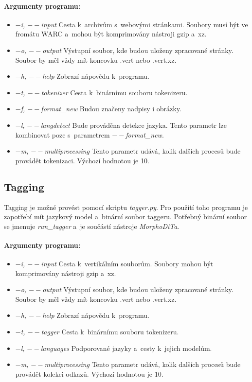 \paragraph{Argumenty programu: }
\begin{itemize}
    \item \textit{$-$i, $--$input} Cesta k~archivům s~webovými stránkami. Soubory musí být ve fromátu WARC a~mohou být komprimovány nástroji gzip a~xz.
    \item \textit{$-$o, $--$output} Výstupní soubor, kde budou uloženy zpracované stránky. Soubor by měl vždy mít koncovku .vert nebo .vert.xz.
    \item \textit{$-$h, $--$help} Zobrazí nápovědu k~programu.
    \item \textit{$-$t, $--$tokenizer} Cesta k~binárnímu souboru tokenizeru.
    \item \textit{$-$f, $--$format\_new} Budou značeny nadpisy i obrázky.
    \item \textit{$-$l, $--$langdetect} Bude prováděna detekce jazyka. Tento parametr lze kombinovat poze s~parametrem \textit{$--$format\_new}.
    \item \textit{$-$m, $--$multiprocessing} Tento parametr udává, kolik dalších procesů bude provádět tokenizaci. Výchozí hodnotou je 10.
\end{itemize}

\subsection{Tagging}
Tagging je možné provést pomocí skriptu \textit{tagger.py}. Pro použití toho programu je zapotřebí
mít jazykový model a~binární soubor taggeru. Potřebný binární soubor se jmenuje \textit{run\_tagger}
a~je součástí nástroje \textit{MorphoDiTa}.

\paragraph{Argumenty programu: }
\begin{itemize}
    \item \textit{$-$i, $--$input} Cesta k~vertikálním souborům. Soubory mohou být komprimovány nástroji gzip a~xz.
    \item \textit{$-$o, $--$output} Výstupní soubor, kde budou uloženy zpracované stránky. Soubor by měl vždy mít koncovku .vert nebo .vert.xz.
    \item \textit{$-$h, $--$help} Zobrazí nápovědu k~programu.
    \item \textit{$-$t, $--$tagger} Cesta k~binárnímu souboru tokenizeru.
    \item \textit{$-$l, $--$languages} Podporované jazyky a~cesty k~jejich modelům.
    \item \textit{$-$m, $--$multiprocessing} Tento parametr udává, kolik dalších procesů bude provádět kolekci odkazů. Výchozí hodnotou je 10.
\end{itemize}

